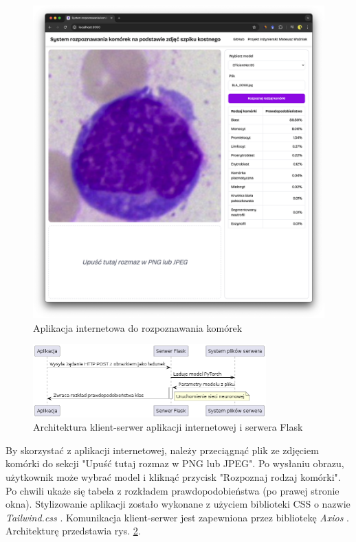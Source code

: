 \begin{figure}
    \centering
    \includegraphics[width=\textwidth]{app}
    \caption{Aplikacja internetowa do rozpoznawania komórek}
    \label{fig:ui}
\end{figure}


\begin{figure}
    \centering
    \includegraphics[width=0.8\textwidth]{arch}
    \caption{Architektura klient-serwer aplikacji internetowej i serwera Flask}
    \label{fig:arch}
\end{figure}

By skorzystać z aplikacji internetowej, należy przeciągnąć plik ze zdjęciem komórki do sekcji "Upuść tutaj rozmaz w PNG lub JPEG".
Po wysłaniu obrazu, użytkownik może wybrać model i kliknąć przycisk "Rozpoznaj rodzaj komórki".
Po chwili ukaże się tabela z rozkładem prawdopodobieństwa (po prawej stronie okna).
Stylizowanie aplikacji zostało wykonane z użyciem biblioteki CSS o nazwie \textit{Tailwind.css} \cite{tailwind}.
Komunikacja klient-serwer jest zapewniona przez bibliotekę \textit{Axios} \cite{axios}.
Architekturę przedstawia rys. \ref{fig:arch}.


